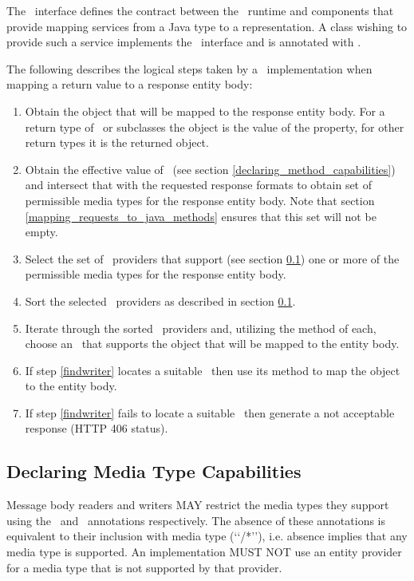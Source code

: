 The \MsgWrite\ interface defines the contract between the \jaxrs\ runtime and components that provide mapping services from a Java type to a representation. A class wishing to provide such a service implements the \MsgWrite\ interface and is annotated with \Provider.

The following describes the logical steps taken by a \jaxrs\ implementation when mapping a return value to a response entity body:

\begin{enumerate}
\item Obtain the object that will be mapped to the response entity body. For a return type of \Response\ or subclasses the object is the value of the  property, for other return types it is the returned object.
\item Obtain the effective value of \ProduceMime\ (see section \ref{declaring_method_capabilities}) and intersect that with the requested response formats to obtain set of permissible media types for the response entity body. Note that section \ref{mapping_requests_to_java_methods} ensures that this set will not be empty.
\item Select the set of \MsgWrite\ providers that support (see section \ref{declaring_provider_capabilities}) one or more of the permissible media types for the response entity body.
\item Sort the selected \MsgWrite\ providers as described in section \ref{declaring_provider_capabilities}.
\item\label{findwriter} Iterate through the sorted \MsgWrite\ providers and, utilizing the  method of each, choose an \MsgWrite\ that supports the object that will be mapped to the entity body.
\item If step \ref{findwriter} locates a suitable \MsgWrite\ then use its  method to map the object to the entity body.
\item If step \ref{findwriter} fails to locate a suitable \MsgWrite\ then generate a not acceptable response (HTTP 406 status).
\end{enumerate}

\subsection{Declaring Media Type Capabilities}
\label{declaring_provider_capabilities}

Message body readers and writers MAY restrict the media types they support using the \ConsumeMime\ and \ProduceMime\ annotations respectively. The absence of these annotations is equivalent to their inclusion with media type (\lq\lq*/*\rq\rq), i.e. absence implies that any media type is supported. An implementation MUST NOT use an entity provider for a media type that is not supported by that provider.


